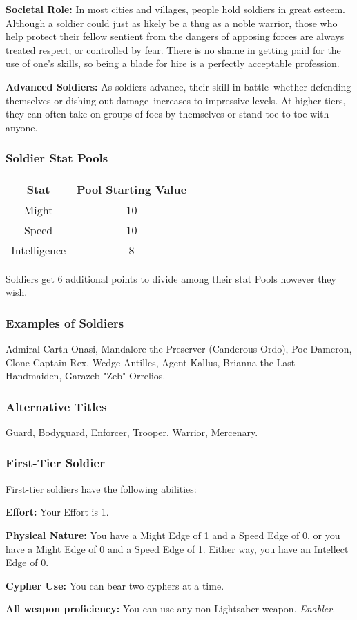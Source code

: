 \documentclass[a4paper,10pt,final,twocolumn,oneside]{book}
\newcommand{\statPool}[5]
{
	\subsubsection*{#1 Stat Pools}
	\label{subsub:#1StatPools}
	\begin{center}
	\begin{tabular}{ |c|c| }
	\hline
	\textbf{Stat} & \textbf{Pool Starting Value} \\
	\hline \hline
	Might & #2 \\
	\hline
 	Speed & #3  \\
 	\hline
 	Intelligence & #4  \\
 	\hline
	\end{tabular}
	\end{center}
	#1s get #5 additional points to divide among their stat Pools however they wish.
}
\newcommand{\itemLine}[2]{\textbf{#1:}{ #2}\par}
\newcommand{\enabler}{\textit{ Enabler.}}
\begin{document}
\itemLine{Societal Role}{In most cities and villages, people hold soldiers in great esteem. Although a soldier could just as likely be a thug as a noble warrior, those who help protect their fellow sentient from the dangers of apposing forces are always treated respect; or controlled by fear. There is no shame in getting paid for the use of one’s skills, so being a blade for hire is a perfectly acceptable profession.}

\itemLine{Advanced Soldiers}{As soldiers advance, their skill in battle--whether defending themselves or dishing out damage--increases to impressive levels. At higher tiers, they can often take on groups of foes by themselves or stand toe-to-toe with anyone.}

\statPool{Soldier}{10}{10}{8}{6}

\subsubsection*{Examples of Soldiers}
\label{subsub:soldierExamples}

Admiral Carth Onasi, Mandalore the Preserver (Canderous Ordo), Poe Dameron, Clone Captain Rex, Wedge Antilles, Agent Kallus, Brianna the Last Handmaiden, Garazeb "Zeb" Orrelios.

\subsubsection*{Alternative Titles}
\label{subsub:soldierAlternative}

Guard, Bodyguard, Enforcer, Trooper, Warrior, Mercenary.


\subsubsection*{First-Tier Soldier}
\label{subsub:soldierFirstTier}

First-tier soldiers have the following abilities:

\itemLine{Effort}{Your Effort is 1.}

\itemLine{Physical Nature}{You have a Might Edge
of 1 and a Speed Edge of 0, or you have a
Might Edge of 0 and a Speed Edge of 1.
Either way, you have an Intellect Edge of 0.}

\itemLine{Cypher Use}{You can bear two cyphers at a time.}

\itemLine{All weapon proficiency}{You can use any non-Lightsaber weapon.\enabler}
\end{document}
